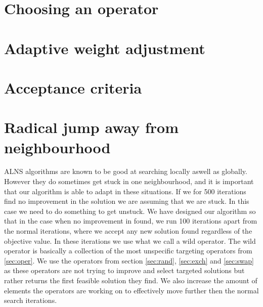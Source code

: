 \documentclass[../main.tex]{subfiles}
\begin{document}
\section{Choosing an operator}
\label{sec:opchice}

\section{Adaptive weight adjustment}
\label{sec:weight}

\section{Acceptance criteria}
\label{sec:accept}

\section{Radical jump away from neighbourhood}
\label{sec:wild}
ALNS algorithms are known to be good at searching locally aswell as globally. However they do sometimes get stuck in one neighbourhood, and it is important that our algorithm is able to adapt in these situations.
If we for 500 iterations find no improvement in the solution we are assuming that we are stuck. In this case we need to do something to get unstuck. 
We have designed our algorithm so that in the case when no improvement in found, we run 100 iterations apart from the normal iterations, where we accept any new solution found regardless of the objective value. 
In these iterations we use what we call a wild operator. 
The wild operator is basically a collection of the most unspecific targeting operators from \ref{sec:oper}.
We use the operators from section \ref{sec:rand}, \ref{sec:exch} and \ref{sec:swap} as these operators are not trying to improve and select targeted solutions but rather returns the first feasible solution they find. 
We also increase the amount of elements the operators are working on to effectively move further then the normal search iterations. 





\biblio                                                         
\end{document}
